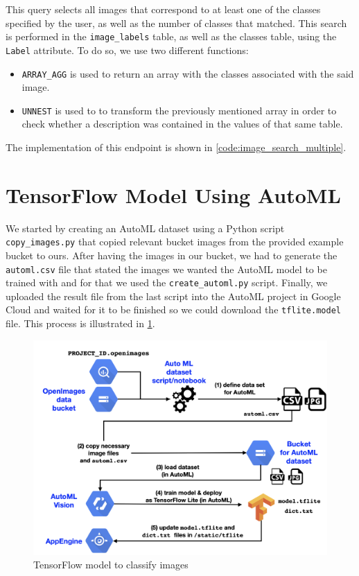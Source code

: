 \documentclass[a4paper, 11pt]{article}
\begin{document}
This query selects all images that correspond to at least one of the classes specified by the user, 
as well as the number of classes that matched. This search is performed in the 
\texttt{image\_labels} table, as well as the classes table, using the \texttt{Label} attribute. To 
do so, we use two different functions:

\begin{itemize}
    \item \texttt{ARRAY\_AGG} is used to return an array with the classes associated with the said 
    image.
    \item \texttt{UNNEST} is used to to transform the previously mentioned array in order to check 
    whether a description was contained in the values of that same table.
\end{itemize}

The implementation of this endpoint is shown in \cref{code:image_search_multiple}.

\pagebreak

\section{TensorFlow Model Using AutoML} \label{sec:tensorflow}

We started by creating an AutoML dataset using a Python script \texttt{copy\_images.py} that copied 
relevant bucket images from the provided example bucket to ours. After having the images in our 
bucket, we had to generate the \texttt{automl.csv} file that stated the images we wanted the AutoML 
model to be trained with and for that we used the \texttt{create\_automl.py} script.
Finally, we uploaded the result file from the last script into the AutoML project in Google Cloud 
and waited for it to be finished so we could download the \texttt{tflite.model} file. This process 
is illustrated in \cref{fig:auto-ml}.

\vspace{\baselineskip}

\begin{figure}[H]
    \centering
    \includegraphics[width=.85\textwidth]{img/automl.png}
    \caption{TensorFlow model to classify images}
    \label{fig:auto-ml}
\end{figure}
\end{document}
